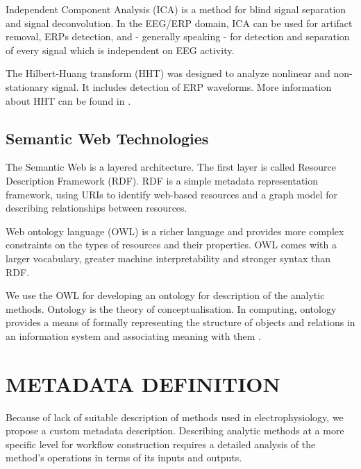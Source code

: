 \documentclass[a4paper,twoside]{article}
\begin{document}
Independent Component Analysis (ICA) \cite{Hyv01} is a method for blind signal separation and signal deconvolution. 
In the EEG/ERP domain, ICA can be used for artifact removal, ERPs detection, and - generally speaking - for detection 
and separation of every signal which is independent on EEG activity.

The  Hilbert-Huang  transform  (HHT)  was  designed  to  analyze  nonlinear  and  non-stationary signal. It includes detection of ERP waveforms.
More information about HHT can be found in \cite{Ciniburk11}.

\subsection{Semantic Web Technologies}

\noindent The Semantic Web is a layered architecture. The first layer
is called Resource Description Framework (RDF). RDF is
a simple metadata representation framework, using URIs to
identify web-based resources and a graph model for describing
relationships between resources.

Web ontology language (OWL) is a richer language and
provides more complex constraints on the types of resources
and their properties. OWL comes with a larger vocabulary,
greater machine interpretability and stronger syntax than RDF.

We use the OWL for developing an ontology for description of the analytic methods. Ontology is the theory of conceptualisation. In computing, ontology 
provides a means of formally representing the structure of objects and relations in an information system and associating meaning with them \cite{Sun07}.


\section{\uppercase{Metadata Definition}}

\noindent Because of lack of suitable description of methods used in electrophysiology, we propose a custom metadata description. Describing analytic methods at a more specific level for workflow construction requires a detailed analysis of the method's operations in terms of its inputs and outputs.
\end{document}
